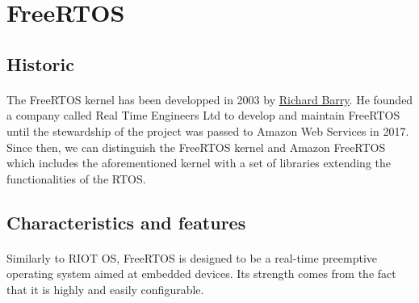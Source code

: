 \section{FreeRTOS}

\subsection{Historic}
\paragraph{}
The FreeRTOS kernel has been developped in 2003 by \href{https://www.linkedin.com/in/richard-barry-4562262/}{Richard Barry}. %
He founded a company called Real Time Engineers Ltd to develop and maintain FreeRTOS until the stewardship of the project was passed to Amazon Web Services in 2017.
Since then, we can distinguish the FreeRTOS kernel and Amazon FreeRTOS which includes the aforementioned kernel 
    with a set of libraries extending the functionalities of the RTOS.

\subsection{Characteristics and features}
\paragraph{}
Similarly to RIOT OS, FreeRTOS is designed to be a real-time preemptive operating system aimed at embedded devices.
Its strength comes from the fact that it is highly and easily configurable.
